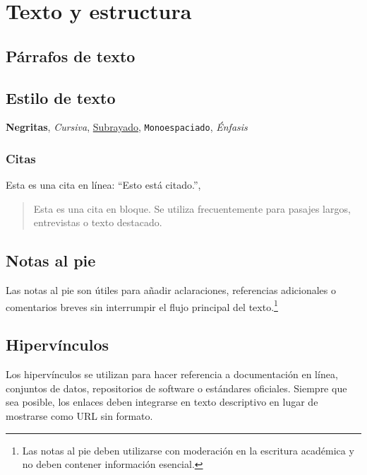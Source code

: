 \section{Texto y estructura}

\subsection{Párrafos de texto}

\lipsum[1-1] %

\subsection{Estilo de texto}
\textbf{Negritas}, \textit{Cursiva}, \underline{Subrayado}, \texttt{Monoespaciado}, \emph{Énfasis}



\subsubsection{Citas}
Esta es una cita en línea: \enquote{Esto está citado.}, 

\begin{quote}
	Esta es una cita en bloque. Se utiliza frecuentemente para pasajes largos, entrevistas o texto destacado.
\end{quote}

\subsection{Notas al pie}
Las notas al pie son útiles para añadir aclaraciones, referencias adicionales o comentarios breves sin interrumpir el flujo principal del texto.\footnote{Las notas al pie deben utilizarse con moderación en la escritura académica y no deben contener información esencial.}

\subsection{Hipervínculos}
Los hipervínculos se utilizan para hacer referencia a documentación en línea, conjuntos de datos, repositorios de software o estándares oficiales. Siempre que sea posible, los enlaces deben integrarse en texto descriptivo en lugar de mostrarse como URL sin formato.

